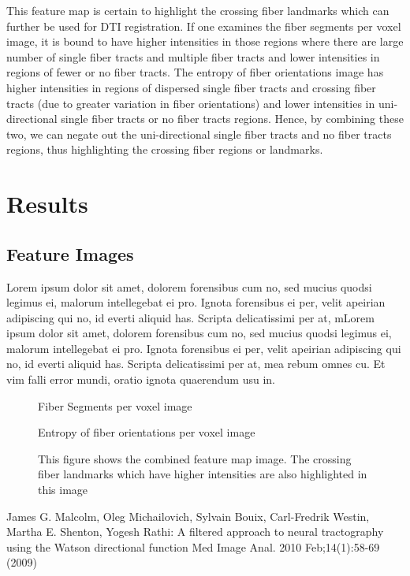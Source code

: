 \documentclass{llncs}
\begin{document}
This feature map is certain to highlight the crossing fiber landmarks which can further be used for DTI registration.
If one examines the fiber segments per voxel image, it is bound to have higher intensities in those regions where there
are large number of single fiber tracts and multiple fiber tracts and lower intensities in regions of fewer or no fiber tracts.
The entropy of fiber orientations image has higher intensities in regions of dispersed single fiber tracts and crossing fiber 
tracts (due to greater variation in fiber orientations) and lower intensities in uni-directional single fiber tracts or no fiber 
tracts regions. Hence, by combining these two, we can negate out the uni-directional single fiber tracts and no fiber tracts regions, 
thus highlighting the crossing fiber regions or landmarks.

\section{Results}
\subsection{Feature Images}
Lorem ipsum dolor sit amet, dolorem forensibus cum no, sed mucius quodsi legimus ei, malorum intellegebat ei pro. 
Ignota forensibus ei per, velit apeirian adipiscing qui no, id everti aliquid has. Scripta delicatissimi per at, 
mLorem ipsum dolor sit amet, dolorem forensibus cum no, sed mucius quodsi legimus ei, malorum intellegebat ei pro. 
Ignota forensibus ei per, velit apeirian adipiscing qui no, id everti aliquid has. Scripta delicatissimi per at, 
mea rebum omnes cu. Et vim falli error mundi, oratio ignota quaerendum usu in. 

\begin{figure}
\centering
{}
\caption{Fiber Segments per voxel image}
\end{figure}

\begin{figure}
\centering
{}
\caption{Entropy of fiber orientations per voxel image}
\end{figure}

\begin{figure}
\centering
{}
\caption{This figure shows the combined feature map image. The crossing fiber landmarks which have higher intensities are also highlighted in this image}
\end{figure}

%
%
\begin{thebibliography}{}
%
James G. Malcolm, Oleg Michailovich, Sylvain Bouix, Carl-Fredrik Westin, Martha E. Shenton, Yogesh Rathi:
A ﬁltered approach to neural tractography using the Watson directional function
Med Image Anal. 2010 Feb;14(1):58-69 (2009)
\end{thebibliography}
\end{document}
